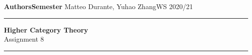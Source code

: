 \documentclass[a4paper,11pt,openany]{scrartcl}
\begin{document}
\noindent\textbf{Authors}\hfill\textbf{Semester} \linebreak
\vspace*{-.1cm} Matteo Durante, Yuhao Zhang\hfill WS 2020/21 \\

\noindent
\rule{\linewidth}{1pt}
\begin{center}
\Large
\textbf{Higher Category Theory} \\
Assignment 8
\end{center}
\rule{\linewidth}{1pt}
\\


\newcommand{\La}{\Lambda}
\newcommand{\pa}{\partial}
\newcommand{\ob}{\operatorname{Ob}}
\newcommand{\mor}{\operatorname{Mor}}
\newcommand{\sto}{\twoheadrightarrow}

\newcommand{\plim}{\varprojlim}
\newcommand{\sst}{\subseteq}
\newcommand{\eq}{\operatorname{eq}}

\newcommand{\f}{\varphi}

\newcommand{\sing}{\operatorname{Sing}}
\end{document}
